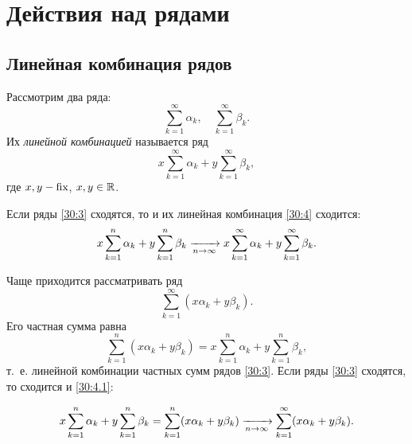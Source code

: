 \documentclass[../../main.tex]{subfiles}
\begin{document}
\section{Действия над рядами}
\subsection{Линейная комбинация рядов}
Рассмотрим два ряда:
\begin{equation}
\label{30:3}
\sum\limits_{k = 1}^{\infty} \alpha_k,\quad
\sum\limits_{k = 1}^{\infty} \beta_k. 
\end{equation}
Их \emph{линейной комбинацией} называется ряд
\begin{equation}
\label{30:4}
x \sum\limits_{k = 1}^{\infty} \alpha_k +
y \sum\limits_{k = 1}^{\infty} \beta_k, 
\end{equation}
где $x,y - \operatorname{fix}$, $x, y \in\mathbb{R}$.

Если ряды \eqref{30:3}
сходятся, то и их линейная комбинация \eqref{30:4} сходится:
\[x \sum\limits_{k = 1}^{n} \alpha_k + y \sum\limits_{k = 1}^{n} \beta_k
\xrightarrow[n \to \infty]{}
x \sum\limits_{k = 1}^{\infty} \alpha_k +
y \sum\limits_{k = 1}^{\infty} \beta_k.\]

Чаще приходится рассматривать ряд 
\begin{equation}
\label{30:4.1}
\sum\limits_{k = 1}^{\infty} (x \alpha_k + y \beta_k). 
\end{equation}
Его частная сумма равна
\[\sum\limits_{k = 1}^{n} (x \alpha_k + y \beta_k) = x \sum\limits_{k = 1}^{n} \alpha_k + y \sum\limits_{k = 1}^{n} \beta_k,\] т.~е. линейной комбинации частных сумм рядов \eqref{30:3}. Если ряды \eqref{30:3} сходятся, то сходится и \eqref{30:4.1}:

\[x \sum\limits_{k = 1}^{n} \alpha_k + y \sum\limits_{k = 1}^{n} \beta_k
= \sum\limits_{k = 1}^{n} (x \alpha_k + y \beta_k)
\xrightarrow[n \to \infty]{}
\sum\limits_{k = 1}^{\infty} (x \alpha_k + y \beta_k).\]
\end{document}
